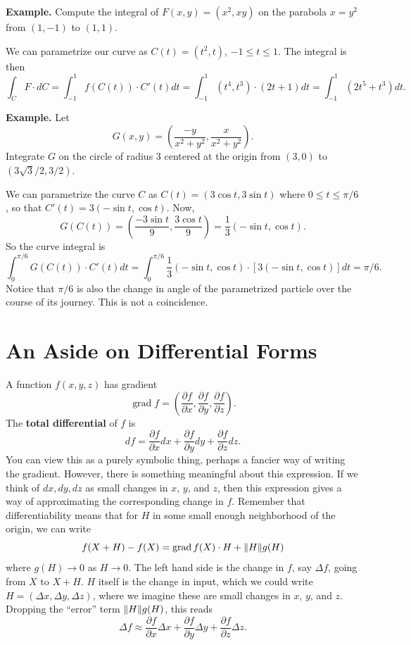 \documentclass{article}
\DeclareMathOperator{\grd}{grad}
\begin{document}
\textbf{Example.} Compute the integral of $F(x,y) = (x^2, xy)$ on the parabola $x=y^2$ from $(1,-1)$ to $(1,1)$.

We can parametrize our curve as $C(t) = (t^2, t)$, $-1 \leq t \leq 1$. The integral is then
\[\int_C F \cdot dC = \int_{-1}^1 f(C(t))\cdot C'(t)dt = \int_{-1}^1(t^4,t^3)\cdot(2t+1)dt = \int_{-1}^1 (2t^5 + t^3)dt.\]

\textbf{Example.} Let 
\[G(x,y) = \left( \frac{-y}{x^2+y^2}, \frac{x}{x^2+y^2} \right).\]
Integrate $G$ on the circle of radius $3$ centered at the origin from $(3,0)$ to $(3\sqrt{3}/2, 3/2)$.

We can parametrize the curve $C$ as $C(t) = (3\cos t, 3\sin t)$ where $0 \leq t \leq \pi/6$, so that 
$C'(t) = 3(-\sin t, \cos t)$. Now,
\[G(C(t)) = \left(\frac{-3\sin t}{9}, \frac{3\cos t}{9}\right) = \frac{1}{3}(-\sin t, \cos t).\]
So the curve integral is 
\[\int_0^{\pi/6} G(C(t))\cdot C'(t)dt = \int_0^{\pi/6} \frac{1}{3}(-\sin t,\cos t)\cdot [3(-\sin t,\cos t)]dt=\pi/6.\]
Notice that $\pi/6$ is also the change in angle of the parametrized particle over the course of its journey. 
This is not a coincidence.

\section*{An Aside on Differential Forms}
A function $f(x,y,z)$ has gradient
\[\grd f = \left( \frac{\partial f}{\partial x}, \frac{\partial f}{\partial y}, \frac{\partial f}{\partial z} \right).\]
The \textbf{total differential} of $f$ is 
\[df = \frac{\partial f}{\partial x} dx + \frac{\partial f}{\partial y} dy + \frac{\partial f}{\partial z}dz.\]
You can view this as a purely symbolic thing, perhaps a fancier way of writing the gradient. However, there is something
meaningful about this expression. If we think of $dx,dy,dz$ as small changes in $x$, $y$, and $z$, then 
this expression gives a way of approximating the corresponding change in $f$. Remember that differentiability means that 
for $H$ in some small enough neighborhood of the origin, we can write
\[f(X+H) - f(X) = \grd f(X) \cdot H + \norm{H} g(H)\]
where $g(H) \to 0$ as $H \to 0$. The left hand side is the change in $f$, say $\Delta f$, going from $X$ to $X+H$.
$H$ itself is the change in input, which we could write $H = (\Delta x, \Delta y, \Delta z)$, where we 
imagine these are small changes in $x$, $y$, and $z$. Dropping the ``error'' term $\norm{H}g(H)$, this reads
\[\Delta f \approx \frac{\partial f}{\partial x} \Delta x + \frac{\partial f}{\partial y} \Delta y + \frac{\partial f}{\partial z} \Delta z. \]
\end{document}
